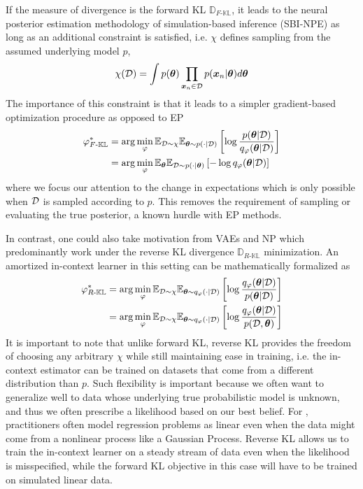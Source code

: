 If the measure of divergence is the forward KL $\mathbb{D}_{F\text{-}\mathbb{KL}}$, it leads to the neural posterior estimation methodology of simulation-based inference (SBI-NPE) as long as an additional constraint is satisfied, i.e. $\chi$ defines sampling from the assumed underlying model $p$, \ie
\begin{align}
    \label{eq:chi_sim}
    \chi({\mathcal{D}}) = \int p({\bm{\theta}}) \prod_{{\bm{x}}_n \in {\mathcal{D}}} p({\bm{x}}_n | {\bm{\theta}}) d{\bm{\theta}}
\end{align}
The importance of this constraint is that it leads to a simpler gradient-based optimization procedure as opposed to EP
\begin{align}
    \varphi^*_{F\text{-}\mathbb{KL}} &= \arg\min_\varphi \mathbb{E}_{{\mathcal{D}} \sim \chi} \mathbb{E}_{{\bm{\theta}} \sim p(\cdot | {\mathcal{D}})} \left[\log \frac{p({\bm{\theta}} | {\mathcal{D}})}{q_\varphi({\bm{\theta}} | {\mathcal{D}})}\right] \\
    \label{eq:afkl}
    &= \arg\min_\varphi \mathbb{E}_{{\bm{\theta}}} \mathbb{E}_{{\mathcal{D}} \sim p(\cdot | {\bm{\theta}})} \left[-\log q_\varphi({\bm{\theta}} | {\mathcal{D}})\right]
\end{align}
where we focus our attention to the change in expectations which is only possible when ${\mathcal{D}}$ is sampled according to $p$. This removes the requirement of sampling or evaluating the true posterior, a known hurdle with EP methods. 

\begin{table*}

\end{table*}
In contrast, one could also take motivation from VAEs and NP which predominantly work under the reverse KL divergence $\mathbb{D}_{R\text{-}\mathbb{KL}}$ minimization. An amortized in-context learner in this setting can be mathematically formalized as
\begin{align}
\varphi^*_{R\text{-}\mathbb{KL}} &= \arg\min_\varphi \mathbb{E}_{{\mathcal{D}} \sim \chi} \mathbb{E}_{{\bm{\theta}} \sim q_\varphi(\cdot | {\mathcal{D}})} \left[\log \frac{q_\varphi({\bm{\theta}} | {\mathcal{D}})}{p({\bm{\theta}} | {\mathcal{D}})}\right] \\
\label{eq:arkl}
&= \arg\min_\varphi \mathbb{E}_{{\mathcal{D}} \sim \chi} \mathbb{E}_{{\bm{\theta}} \sim q_\varphi(\cdot | {\mathcal{D}})} \left[\log \frac{q_\varphi({\bm{\theta}} | {\mathcal{D}})}{p({\mathcal{D}}, {\bm{\theta}})}\right]
\end{align}
It is important to note that unlike forward KL, reverse KL provides the freedom of choosing any arbitrary $\chi$ while still maintaining ease in training, i.e. the in-context estimator can be trained on datasets that come from a different distribution than $p$. Such flexibility is important because we often want to generalize well to data whose underlying true probabilistic model is unknown, and thus we often prescribe a likelihood based on our best belief. For \eg, practitioners often model regression problems as linear even when the data might come from a nonlinear process like a Gaussian Process. Reverse KL allows us to train the in-context learner on a steady stream of data even when the likelihood is misspecified, while the forward KL objective in this case will have to be trained on simulated linear data.

